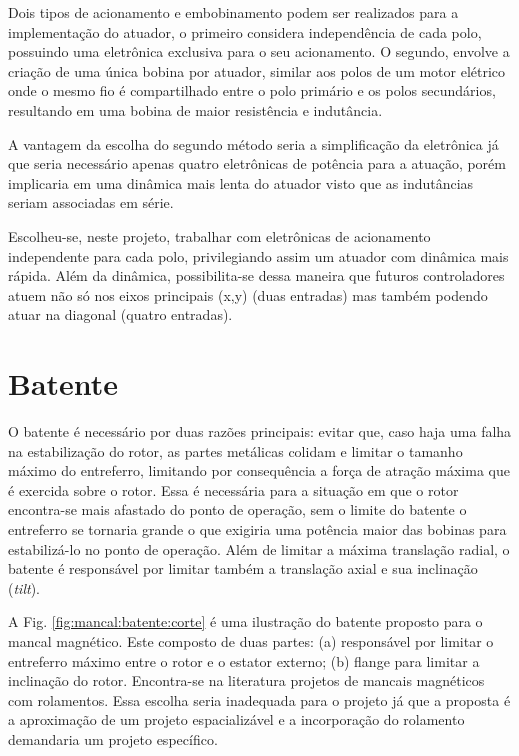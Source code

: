 Dois tipos de acionamento e embobinamento podem ser realizados para a implementação do atuador, o primeiro considera independência de cada polo, possuindo uma eletrônica exclusiva para o seu acionamento. O segundo, envolve a criação de uma única bobina por atuador, similar aos polos de um motor elétrico onde o mesmo fio é compartilhado entre o polo primário e os polos secundários, resultando em uma bobina de maior resistência e indutância. 

A vantagem da escolha do segundo método seria a simplificação da eletrônica já que seria necessário apenas quatro eletrônicas de potência para a atuação, porém implicaria em uma dinâmica mais lenta do atuador visto que as indutâncias seriam associadas em série.

Escolheu-se, neste projeto, trabalhar com eletrônicas de acionamento independente para cada polo, privilegiando assim um atuador com dinâmica mais rápida. Além da dinâmica, possibilita-se dessa maneira que futuros controladores atuem não só nos eixos principais (x,y) (duas entradas) mas também podendo atuar na diagonal (quatro entradas). 

\section{Batente}

 O batente é necessário por duas razões principais: evitar que, caso haja uma falha na estabilização do rotor, as partes metálicas colidam e limitar o tamanho máximo do entreferro, limitando por consequência a força de atração máxima que é exercida sobre o rotor.  Essa é necessária para a situação em que o rotor encontra-se mais afastado do ponto de operação, sem o limite do batente o entreferro se tornaria grande o que exigiria uma potência maior das bobinas para estabilizá-lo no ponto de operação.  Além de limitar a máxima translação radial, o batente é responsável por limitar também a translação axial e sua inclinação (\textit{tilt}).
 
 A Fig. \ref{fig:mancal:batente:corte} é uma ilustração do batente proposto para o mancal magnético. Este composto de duas partes: (a) responsável por limitar o entreferro máximo entre o rotor e o estator externo; (b) flange para limitar a inclinação do rotor. Encontra-se na literatura projetos de mancais magnéticos com rolamentos. Essa escolha seria inadequada para o projeto já que a proposta é a aproximação de um projeto espacializável e a incorporação do rolamento demandaria um projeto específico.
 
